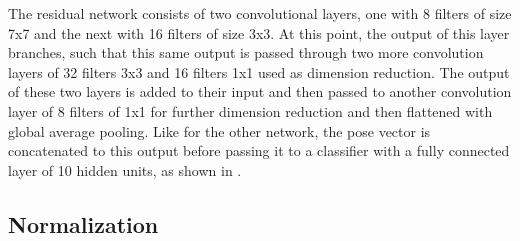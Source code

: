 The residual network consists of two convolutional layers, one with 8 filters of size 7x7 and the next with 16 filters of size 3x3.
At this point, the output of this layer branches, such that this same output is passed through two more convolution layers of 32 filters 3x3 and 16 filters 1x1 used as dimension reduction. 
The output of these two layers is added to their input and then passed to another convolution layer of 8 filters of 1x1 for further dimension reduction and then flattened with global average pooling. 
Like for the other network, the pose vector is concatenated to this output before passing it to a classifier with a fully connected layer of 10 hidden units, as shown in .

\subsection{Normalization}
\label{sec:normalization}

